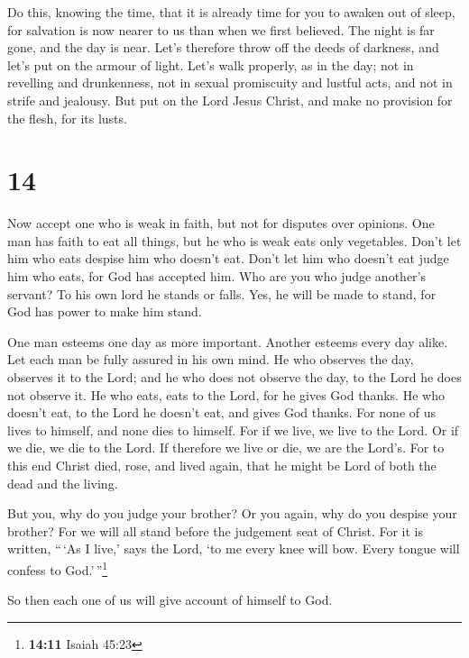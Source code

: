  Do this, knowing the time, that it is already time for
you to awaken out of sleep, for salvation is now nearer to us than when
we first believed.  The night is far gone, and the day is
near. Let's therefore throw off the deeds of darkness, and let's put on
the armour of light.  Let's walk properly, as in the day;
not in revelling and drunkenness, not in sexual promiscuity and lustful
acts, and not in strife and jealousy.  But put on the
Lord Jesus Christ, and make no provision for the flesh, for its lusts.

\hypertarget{section-13}{%
\section{14}\label{section-13}}

 Now accept one who is weak in faith, but not for disputes
over opinions.  One man has faith to eat all things, but
he who is weak eats only vegetables.  Don't let him who
eats despise him who doesn't eat. Don't let him who doesn't eat judge
him who eats, for God has accepted him.  Who are you who
judge another's servant? To his own lord he stands or falls. Yes, he
will be made to stand, for God has power to make him stand.

 One man esteems one day as more important. Another
esteems every day alike. Let each man be fully assured in his own mind.
 He who observes the day, observes it to the Lord; and he
who does not observe the day, to the Lord he does not observe it. He who
eats, eats to the Lord, for he gives God thanks. He who doesn't eat, to
the Lord he doesn't eat, and gives God thanks.  For none
of us lives to himself, and none dies to himself.  For if
we live, we live to the Lord. Or if we die, we die to the Lord. If
therefore we live or die, we are the Lord's.  For to this
end Christ died, rose, and lived again, that he might be Lord of both
the dead and the living.

 But you, why do you judge your brother? Or you again,
why do you despise your brother? For we will all stand before the
judgement seat of Christ.  For it is written, ``\,`As I
live,' says the Lord, `to me every knee will bow. Every tongue will
confess to God.'\,''\footnote{\textbf{14:11} Isaiah 45:23}

 So then each one of us will give account of himself to
God.

